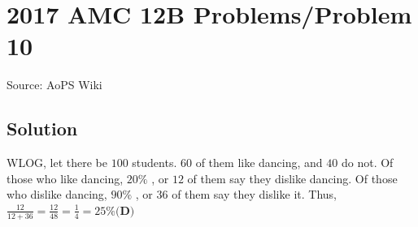 \documentclass[12pt]{article}
\begin{document}
\section*{{2017 AMC 12B Problems/Problem 10}}
Source: AoPS Wiki

\subsection*{Solution}
WLOG, let there be $100$ students. $60$ of them like dancing, and $40$ do not. Of those who like dancing, $20\%$ , or $12$ of them say they dislike dancing. Of those who dislike dancing, $90\%$ , or $36$ of them say they dislike it. Thus, $\frac{12}{12+36} = \frac{12}{48} = \frac{1}{4} = 25\% \boxed{\textbf{(D)}}$
\end{document}
